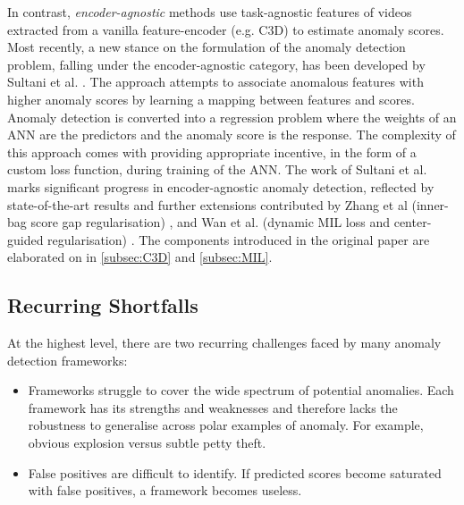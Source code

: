 \documentclass[sigplan,authorversion,nonacm, 9pt]{acmart}
\begin{document}
In contrast, \textit{encoder-agnostic} methods use task-agnostic features of videos extracted from a vanilla feature-encoder \cite{feng} (e.g. C3D) to estimate anomaly scores. Most recently, a new stance on the formulation of the anomaly detection problem, falling under the encoder-agnostic category, has been developed by Sultani et al. \cite{sultani}. The approach attempts to associate anomalous features with higher anomaly scores by learning a mapping between features and scores. Anomaly detection is converted into a regression problem where the weights of an ANN are the predictors and the anomaly score is the response. The complexity of this approach comes with providing appropriate incentive, in the form of a custom loss function, during training of the ANN. The work of Sultani et al. marks significant progress in encoder-agnostic anomaly detection, reflected by state-of-the-art results and further extensions contributed by Zhang et al (inner-bag score gap regularisation) \cite{innerbag}, and Wan et al. (dynamic MIL loss and center-guided regularisation) \cite{dynamicmil}.
The components introduced in the original paper \cite{sultani} are elaborated on in \ref{subsec:C3D} and \ref{subsec:MIL}.

\subsection{Recurring Shortfalls} \label{subsec:shortfalls}
At the highest level, there are two recurring challenges faced by many anomaly detection frameworks:
\begin{itemize}
    \item Frameworks struggle to cover the wide spectrum of potential anomalies. Each framework has its strengths and weaknesses and therefore lacks the robustness to generalise across polar examples of anomaly. For example, obvious explosion versus subtle petty theft.
    \item False positives are difficult to identify. If predicted scores become saturated with false positives, a framework becomes useless. 
\end{itemize}
\end{document}
